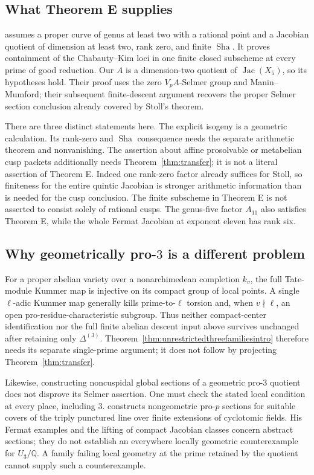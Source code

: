 \documentclass[11pt]{article}
\newcommand{\Q}{\mathbb Q}
\numberwithin{equation}{section}
\newcommand{\Sha}{\operatorname{Sha}}
\newcommand{\Jac}{\operatorname{Jac}}
\theoremstyle{definition}
\begin{document}
\subsection{What Theorem E supplies}
\citet[Theorem E and \S5.7]{BKL2026} assumes a proper curve of genus at
least two with a rational point and a Jacobian quotient of dimension
at least two, rank zero, and finite $\Sha$. It proves containment of
the Chabauty--Kim loci in one finite closed subscheme at every prime
of good reduction. Our $A$ is a dimension-two quotient of
$\Jac(X_5)$, so its hypotheses hold. Their proof uses the zero
$V_pA$-Selmer group and Manin--Mumford; their subsequent finite-descent
argument recovers the proper Selmer section conclusion already
covered by Stoll's theorem.

There are three distinct statements here. The explicit isogeny is a
geometric calculation. Its rank-zero and $\Sha$ consequence needs the
separate arithmetic theorem and nonvanishing. The assertion about
affine prosolvable or metabelian cusp packets additionally needs
Theorem~\ref{thm:transfer}; it is not a literal assertion of Theorem E.
Indeed one rank-zero factor already suffices for Stoll, so finiteness
for the entire quintic Jacobian is stronger arithmetic information
than is needed for the cusp conclusion. The finite subscheme in
Theorem E is not asserted to consist solely of rational cusps.
The genus-five factor $A_{11}$ also satisfies Theorem E, while the
whole Fermat Jacobian at exponent eleven has rank six.

\subsection{Why geometrically pro-\texorpdfstring{$3$}{3} is a different problem}
For a proper abelian variety over a nonarchimedean completion $k_v$,
the full Tate-module Kummer
map is injective on its compact group of local points. A single
$\ell$-adic Kummer map generally kills prime-to-$\ell$ torsion and,
when $v\nmid\ell$, an open pro-residue-characteristic subgroup.
Thus neither compact-center identification nor the full finite
abelian descent input above survives unchanged after retaining only
$\Delta^{(3)}$. Theorem~\ref{thm:unrestrictedthreefamiliesintro} therefore needs its separate
single-prime argument; it does not follow by projecting
Theorem~\ref{thm:transfer}.

Likewise, constructing noncuspidal global sections of a geometric
pro-$3$ quotient does not disprove its Selmer assertion. One must check
the stated local condition at every place, including $3$.
\citet[Theorem A; Theorem 3.5 and Corollary 3.6]{Hoshi2010} constructs
nongeometric pro-$p$ sections for suitable covers of the triply
punctured line over finite extensions of cyclotomic fields. His
Fermat examples and the lifting of compact Jacobian classes concern
abstract sections; they do not establish an everywhere locally
geometric counterexample for $U_3/\Q$. A family failing local
geometry at the prime retained by the quotient cannot supply such
a counterexample.
\end{document}

